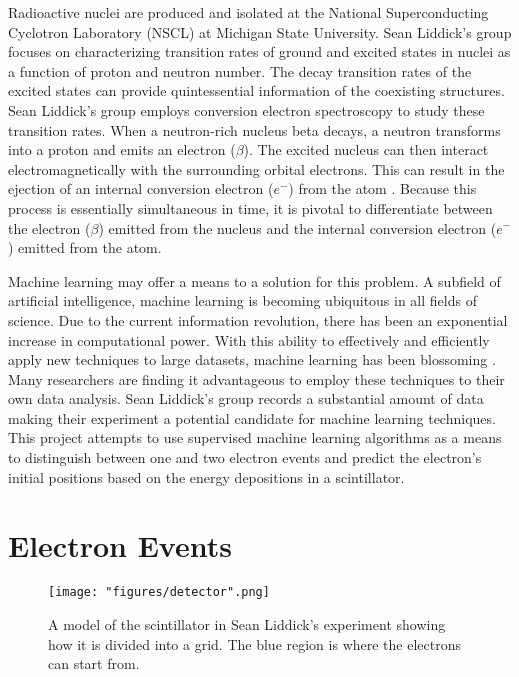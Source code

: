 \documentclass[12pt]{article}
\begin{document}
Radioactive nuclei are produced and isolated at the National Superconducting Cyclotron Laboratory (NSCL) at Michigan State University. Sean Liddick's group focuses on characterizing transition rates of ground and excited states in nuclei as a function of proton and neutron number. The decay transition rates of the excited states can provide quintessential information of the coexisting structures. Sean Liddick's group employs conversion electron spectroscopy to study these transition rates. When a neutron-rich nucleus beta decays, a neutron transforms into a proton and emits an electron ($\beta$). The excited nucleus can then interact electromagnetically with the surrounding orbital electrons. This can result in the ejection of an internal conversion electron ($e^{-}$) from the atom \cite{DRAGOUN19831}. Because this process is essentially simultaneous in time, it is pivotal to differentiate between the electron ($\beta$) emitted from the nucleus and the internal conversion electron ($e^{-}$) emitted from the atom.

Machine learning may offer a means to a solution for this problem. A subfield of artificial intelligence, machine learning is becoming ubiquitous in all fields of science. Due to the current information revolution, there has been an exponential increase in computational power. With this ability to effectively and efficiently apply new techniques to large datasets, machine learning has been blossoming \cite{mehta}. Many researchers are finding it advantageous to employ these techniques to their own data analysis. Sean Liddick's group records a substantial amount of data making their experiment a potential candidate for machine learning techniques. This project attempts to use supervised machine learning algorithms as a means to distinguish between one and two electron events and predict the electron's initial positions based on the energy depositions in a scintillator.

\section{Electron Events}

\begin{wrapfigure}{r}{0.5\textwidth}
    \centering
    \texttt{[image: "figures/detector".png]}
    \caption{A model of the scintillator in Sean Liddick's experiment showing how it is divided into a grid. The blue region is where the electrons can start from.}
    \label{fig:detector}
\end{wrapfigure}
\end{document}
